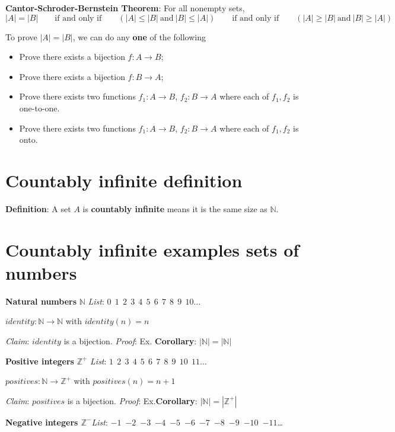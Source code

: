 \documentclass[12pt, oneside]{article}
\begin{document}
{\bf Cantor-Schroder-Bernstein Theorem}: For all nonempty sets,
\[
|A| = |B| \qquad\text{if and only if} \qquad (|A| \leq |B| ~\text{and}~ |B| \leq |A|)
\qquad\text{if and only if} \qquad (|A| \geq |B| ~\text{and}~ |B| \geq |A|)
\]

To prove $|A| = |B|$,  we can do any {\bf one} of the following

\begin{itemize}\setlength{\itemsep}{-5pt}
\item Prove there exists  a bijection $f:  A \to B$;
\item Prove there exists a  bijection  $f: B  \to  A$;
\item Prove there exists two functions $f_1: A \to B$, $f_2: B \to  A$ where each of $f_1, f_2$ is one-to-one.
\item Prove there exists two functions $f_1: A \to B$, $f_2: B \to  A$ where each of $f_1, f_2$ is onto.
\end{itemize} \vfill
\section*{Countably infinite definition}


{\bf Definition}: A set $A$ is {\bf countably infinite} means it is the 
same size as $\mathbb{N}$.

 \vfill
\section*{Countably infinite examples sets of numbers}


{\bf Natural numbers} $\mathbb{N}$ \hfill {\it List}:  $0~~1~~2~~3~~4~~5~~6~~7~~8~~9~~10 \ldots$

$identity: \mathbb{N} \to \mathbb{N}$ with $identity(n) = n$

{\it Claim}: $identity$ is a bijection. {\it Proof}: Ex. \hfill {\bf Corollary}: $ | \mathbb{N} | = |\mathbb{N}|~$

{\bf Positive integers} $\mathbb{Z}^+$ \hfill {\it List}:  $1~~2~~3~~4~~5~~6~~7~~8~~9~~10~~11\ldots$

$positives: \mathbb{N} \to \mathbb{Z}^+$ with $positives(n) = n+1$

{\it Claim}: $positives$ is a bijection.  {\it Proof}: Ex.\hfill {\bf Corollary}: $ | \mathbb{N} | = |\mathbb{Z}^+|$

{\bf Negative integers $\mathbb{Z}^-$}\hfill  {\it List}: $-1$~$-2$~$-3$~$-4$~$-5$~$-6$~$-7$~$-8$~$-9$~$-10$~$-11$\ldots
\end{document}
